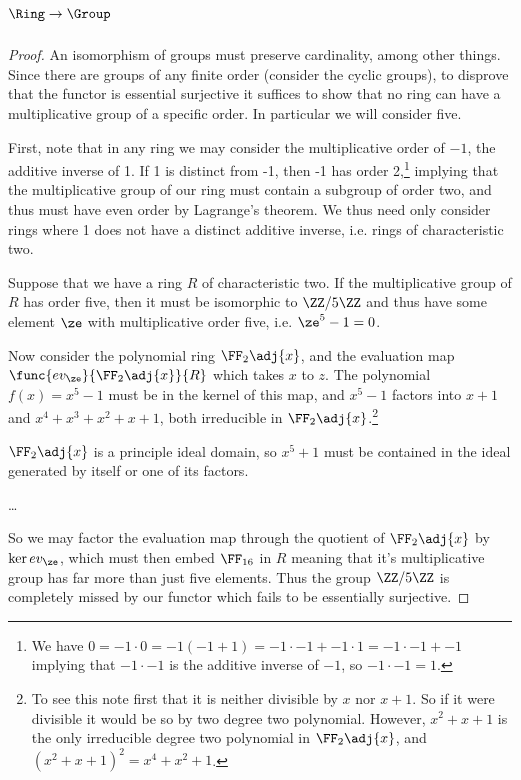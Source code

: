 \documentclass[main.tex]{subfiles}
\begin{document}
\subparagraph{\(\Ring\to\Group\)}
\begin{proof}
	An isomorphism of groups must preserve cardinality, among other things.
	Since there are groups of any finite order (consider the cyclic groups), to
	disprove that the functor is essential surjective it suffices to show that
	no ring can have a multiplicative group of a specific order. In particular
	we will consider five.

	First, note that in any ring we may consider the multiplicative order of
	\(-1\), the additive inverse of 1. If 1 is distinct from -1, then -1 has
	order 2,\footnote{We have
		\(0=-1\cdot 0=-1(-1+1)=-1\cdot-1+-1\cdot1=-1\cdot-1+-1\) implying that
	\(-1\cdot-1\) is the additive inverse of \(-1\), so \(-1\cdot-1=1\).}
	implying that the multiplicative group of our ring must contain a subgroup
	of order two, and thus must have even order by Lagrange's theorem. We thus
	need only consider rings where 1 does not have a distinct additive inverse,
	i.e. rings of characteristic two.

	Suppose that we have a ring \(R\) of characteristic two. If the
	multiplicative group of \(R\) has order five, then it must be isomorphic to
	\(\ZZ/5\ZZ\) and thus have some element \(\ze\) with multiplicative order
	five, i.e. \(\ze^5-1=0\).

	Now consider the polynomial ring \(\FF_2\adj{x}\), and the evaluation map
	\(\func{ev_\ze}{\FF_2\adj{x}}{R}\) which takes \(x\) to \(z\). The
	polynomial \(f(x)=x^5-1\) must be in the kernel of this map, and \(x^5-1\)
	factors into \(x+1\) and \(x^4+x^3+x^2+x+1\), both irreducible in
	\(\FF_2\adj{x}\).\footnote{To see this note first that it is neither
		divisible by \(x\) nor \(x+1\). So if it were divisible it would be so
		by two degree two polynomial. However, \(x^2+x+1\) is the only
		irreducible degree two polynomial in \(\FF_2\adj{x}\), and
	\((x^2+x+1)^2=x^4+x^2+1\).}

	\(\FF_2\adj{x}\) is a principle ideal domain, so \(x^5+1\) must be contained
	in the ideal generated by itself or one of its factors.

	\dots


	So we may factor the evaluation map through the quotient of \(\FF_2\adj{x}\)
	by \(\ker ev_\ze\), which must then embed \(\FF_{16}\) in \(R\) meaning that
	it's multiplicative group has far more than just five elements. Thus the
	group \(\ZZ/5\ZZ\) is completely missed by our functor which fails to be
	essentially surjective.


\end{proof}
\end{document}
